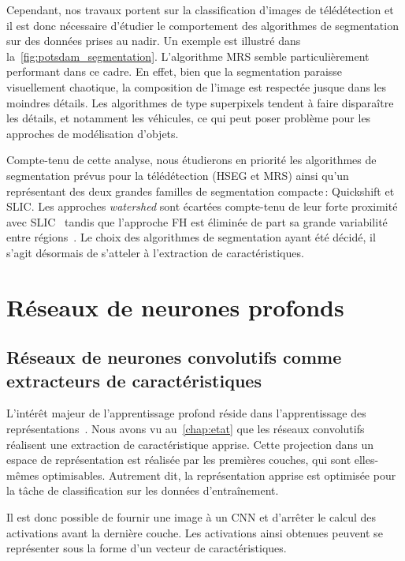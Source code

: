 Cependant, nos travaux portent sur la classification d'images de télédétection et il est donc nécessaire d'étudier le comportement des algorithmes de segmentation sur des données prises au nadir. Un exemple est illustré dans la~\cref{fig:potsdam_segmentation}. L'algorithme \gls{MRS} semble particulièrement performant dans ce cadre. En effet, bien que la segmentation paraisse visuellement chaotique, la composition de l'image est respectée jusque dans les moindres détails. Les algorithmes de type superpixels tendent à faire disparaître les détails, et notamment les véhicules, ce qui peut poser problème pour les approches de modélisation d'objets.

Compte-tenu de cette analyse, nous étudierons en priorité les algorithmes de segmentation prévus pour la télédétection (\gls{HSEG} et \gls{MRS}) ainsi qu'un représentant des deux grandes familles de segmentation compacte\,: Quickshift et \gls{SLIC}. Les approches \emph{watershed} sont écartées compte-tenu de leur forte proximité avec \gls{SLIC}~\cite{neubert_compact_2014} tandis que l'approche \gls{FH} est éliminée de part sa grande variabilité entre régions~\cite{neubert_superpixel_2012}. Le choix des algorithmes de segmentation ayant été décidé, il s'agit désormais de s'atteler à l'extraction de caractéristiques.

\section{Réseaux de neurones profonds}

\subsection{Réseaux de neurones convolutifs comme extracteurs de caractéristiques}

L'intérêt majeur de l'apprentissage profond réside dans l'apprentissage des représentations~\cite{bengio_representation_2013,goodfellow_deep_2016}. Nous avons vu au~\cref{chap:etat} que les réseaux convolutifs réalisent une extraction de caractéristique apprise. Cette projection dans un espace de représentation est réalisée par les premières couches, qui sont elles-mêmes optimisables. Autrement dit, la représentation apprise est optimisée pour la tâche de classification sur les données d'entraînement.

Il est donc possible de fournir une image à un \gls{CNN} et d'arrêter le calcul des activations avant la dernière couche. Les activations ainsi obtenues peuvent se représenter sous la forme d'un vecteur de caractéristiques.


